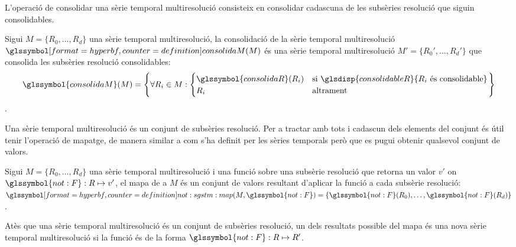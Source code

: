 L'operació de consolidar una sèrie temporal multiresolució consisteix
en consolidar cadascuna de les subsèries resolució que siguin
consolidables.
\begin{definition}
  Sigui $M=\{R_0,\dotsc,R_d\}$ una sèrie temporal multiresolució, la
  consolidació de la sèrie temporal multiresolució
  $\glssymboldef{consolidaM}(M)$ és una sèrie temporal multiresolució
  $M'=\{R_0',\dotsc,R_d'\}$ que consolida les subsèries resolució
  consolidables:
  \[
  \glssymbol{consolidaM}(M) = \left\{ \forall R_i\in M:
  \begin{cases}
    \glssymbol{consolidaR}(R_i) & \text{si }
    \glsdisp{consolidableR}{R_i \text{ és
        consolidable}}\\
    R_i & \text{altrament}
  \end{cases}\right\}
  \].
\end{definition}



Una sèrie temporal multiresolució és un conjunt de subsèries
resolució. Per a tractar amb tots i cadascun dels elements del conjunt
és útil tenir l'operació de mapatge, de manera similar a com s'ha
definit per les sèries temporals però que es pugui obtenir qualsevol
conjunt de valors.
 \begin{definition}
   \label{def:sgstm:mapa}
   Sigui $M=\{R_0,\dotsc,R_d\}$ una sèrie temporal multiresolució i
    una funció sobre una subsèrie resolució que
   retorna un valor $v'$ on $\glssymbol{not:F}:R\mapsto v'$, el mapa
   de  a $M$ és un conjunt de valors resultant
   d'aplicar la funció a cada subsèrie resolució:
   $\glssymboldef{not:sgstm:map}(M,\glssymbol{not:F}) = \{
   \glssymbol{not:F}(R_0), \dotsc, \glssymbol{not:F}(R_d) \}$.
\end{definition}
Atès que una sèrie temporal multiresolució és un conjunt de subsèries
resolució, un dels resultats possible del mapa és una nova sèrie
temporal multiresolució si la funció és de la forma
$\glssymbol{not:F}:R\mapsto R'$.







